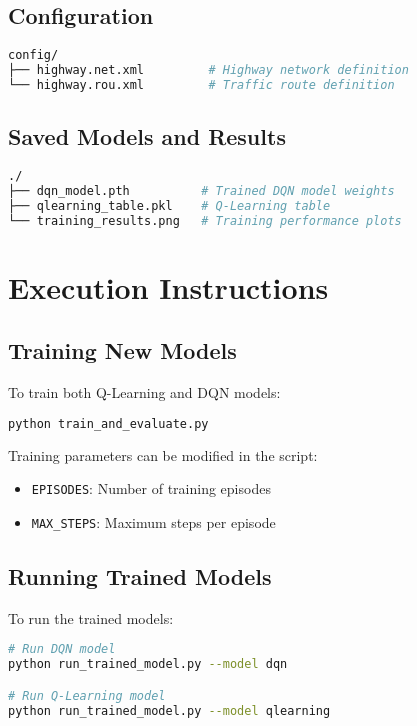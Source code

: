 \documentclass[12pt,a4paper]{article}
\begin{document}
\subsection{Configuration}
\begin{lstlisting}[language=bash]
config/
├── highway.net.xml         # Highway network definition
└── highway.rou.xml         # Traffic route definition
\end{lstlisting}

\subsection{Saved Models and Results}
\begin{lstlisting}[language=bash]
./
├── dqn_model.pth          # Trained DQN model weights
├── qlearning_table.pkl    # Q-Learning table
└── training_results.png   # Training performance plots
\end{lstlisting}

\section{Execution Instructions}

\subsection{Training New Models}
To train both Q-Learning and DQN models:
\begin{lstlisting}[language=bash]
python train_and_evaluate.py
\end{lstlisting}

Training parameters can be modified in the script:
\begin{itemize}
    \item \texttt{EPISODES}: Number of training episodes
    \item \texttt{MAX\_STEPS}: Maximum steps per episode
\end{itemize}

\subsection{Running Trained Models}
To run the trained models:
\begin{lstlisting}[language=bash]
# Run DQN model
python run_trained_model.py --model dqn

# Run Q-Learning model
python run_trained_model.py --model qlearning
\end{lstlisting}
\end{document}
